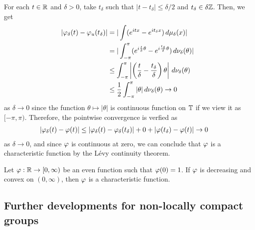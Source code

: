 \documentclass[10pt]{article}
\begin{document}
\begin{pf}
For each $t\in\mathbb{R}$ and $\delta>0$, take $t_\delta$ such that $|t-t_\delta|\le\delta/2$ and $t_\delta\in\delta\mathbb{Z}$.
Then, we get
\begin{align*}
|\varphi_\delta(t)-\varphi_u(t_\delta)|
&=|\int(e^{itx}-e^{it_\delta x})\,d\mu_\delta(x)|\\
&=|\int_{-\pi}^\pi(e^{i\frac t\delta\theta}-e^{i\frac{t_\delta}\delta\theta})\,d\nu_\delta(\theta)|\\
&\le\int_{-\pi}^\pi\left|\left(\frac t\delta-\frac{t_\delta}\delta\right)\theta\right|\,d\nu_\delta(\theta)\\
&\le\frac12\int_{-\pi}^\pi|\theta|\,d\nu_\delta(\theta)\to0
\end{align*}
as $\delta\to0$ since the function $\theta\mapsto|\theta|$ is continuous function on $\mathbb{T}$ if we view it as $[-\pi,\pi)$.
Therefore, the pointwise convergence is verfied as
\begin{align*}
|\varphi_\delta(t)-\varphi(t)|&\le|\varphi_\delta(t)-\varphi_\delta(t_\delta)|+0+|\varphi(t_\delta)-\varphi(t)|\to0
\end{align*}
as $\delta\to0$, and since $\varphi$ is continuous at zero, we can conclude that $\varphi$ is a characteristic function by the L\'evy continuity theorem.
\end{pf}


\begin{cor}
Let $\varphi:\mathbb{R}\to[0,\infty)$ be an even function such that $\varphi(0)=1$.
If $\varphi$ is decreasing and convex on $(0,\infty)$, then $\varphi$ is a characteristic function.
\end{cor}
\begin{pf}

\end{pf}

\begin{ex}

\end{ex}

\subsection{Further developments for non-locally compact groups}
\iffalse
bochner
measure <=> pos def continuous

schwarts bochner (finite condition removed)
tempered measure <=> pos def tempered dist


on hilbert space
measure <=> pos def continuous + trace class
\fi
\end{document}
